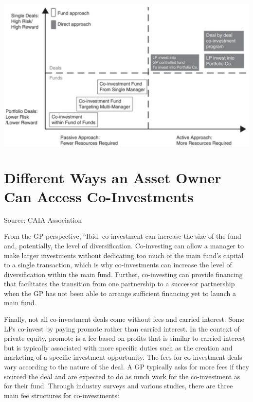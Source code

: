 \documentclass[11pt]{article}
\begin{document}
\begin{center}
\includegraphics[max width=\textwidth]{2024_04_10_a087d40a569f64263ea7g-2}
\end{center}

\section*{Different Ways an Asset Owner Can Access Co-Investments}
Source: CAIA Association

From the GP perspective, ${ }^{5} \mathrm{Ibid}$. co-investment can increase the size of the fund and, potentially, the level of diversification. Co-investing can allow a manager to make larger investments without dedicating too much of the main fund's capital to a single transaction, which is why co-investments can increase the level of diversification within the main fund. Further, co-investing can provide financing that facilitates the transition from one partnership to a successor partnership when the GP has not been able to arrange sufficient financing yet to launch a main fund.

Finally, not all co-investment deals come without fees and carried interest. Some LPs co-invest by paying promote rather than carried interest. In the context of private equity, promote is a fee based on profits that is similar to carried interest but is typically associated with more specific duties such as the creation and marketing of a specific investment opportunity. The fees for co-investment deals vary according to the nature of the deal. A GP typically asks for more fees if they sourced the deal and are expected to do as much work for the co-investment as for their fund. Through industry surveys and various studies, there are three main fee structures for co-investments:
\end{document}
